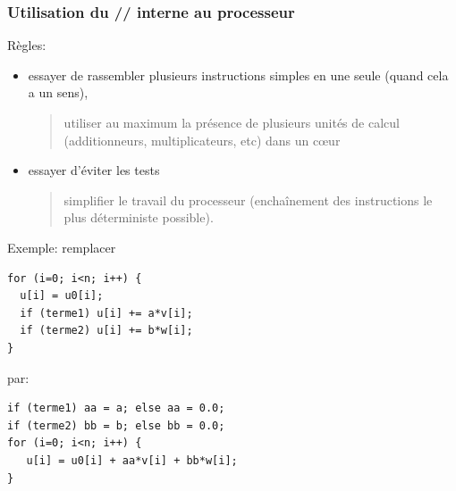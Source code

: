 \documentclass{beamer}
\begin{document}
\begin{frame}[fragile]
\frametitle{Utilisation du // interne au processeur}
Règles: 
\begin{itemize}
	\item essayer de rassembler plusieurs instructions simples en une seule (quand cela a un sens),
	\begin{quote}
		utiliser au maximum la pr\'esence de plusieurs unit\'es de calcul (additionneurs, multiplicateurs, etc) dans un c\oe ur
	\end{quote}
	\item  essayer d'\'eviter les tests
	\begin{quote}
		simplifier le travail du processeur (encha\^{i}nement des instructions le plus d\'eterministe possible).
	\end{quote}
\end{itemize}


\end{frame}

\begin{frame}[fragile]
Exemple: remplacer
\begin{lstlisting}
for (i=0; i<n; i++) {
  u[i] = u0[i];
  if (terme1) u[i] += a*v[i];
  if (terme2) u[i] += b*w[i];
}
\end{lstlisting}

par:
\begin{lstlisting}
if (terme1) aa = a; else aa = 0.0;
if (terme2) bb = b; else bb = 0.0;
for (i=0; i<n; i++) {
   u[i] = u0[i] + aa*v[i] + bb*w[i];
}
\end{lstlisting}

\end{frame}
\end{document}
